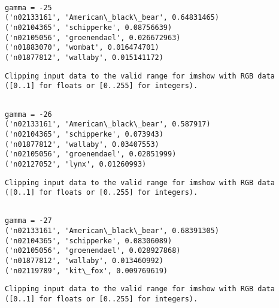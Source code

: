 \documentclass[11pt]{article}
\begin{document}
    \begin{Verbatim}[commandchars=\\\{\}]

gamma = -25
('n02133161', 'American\_black\_bear', 0.64831465)
('n02104365', 'schipperke', 0.08756639)
('n02105056', 'groenendael', 0.026672963)
('n01883070', 'wombat', 0.016474701)
('n01877812', 'wallaby', 0.015141172)

    \end{Verbatim}

    \begin{Verbatim}[commandchars=\\\{\}]
Clipping input data to the valid range for imshow with RGB data ([0..1] for floats or [0..255] for integers).

    \end{Verbatim}

    \begin{Verbatim}[commandchars=\\\{\}]

gamma = -26
('n02133161', 'American\_black\_bear', 0.587917)
('n02104365', 'schipperke', 0.073943)
('n01877812', 'wallaby', 0.03407553)
('n02105056', 'groenendael', 0.02851999)
('n02127052', 'lynx', 0.01260993)

    \end{Verbatim}

    \begin{Verbatim}[commandchars=\\\{\}]
Clipping input data to the valid range for imshow with RGB data ([0..1] for floats or [0..255] for integers).

    \end{Verbatim}

    \begin{Verbatim}[commandchars=\\\{\}]

gamma = -27
('n02133161', 'American\_black\_bear', 0.68391305)
('n02104365', 'schipperke', 0.08306089)
('n02105056', 'groenendael', 0.028927868)
('n01877812', 'wallaby', 0.013460992)
('n02119789', 'kit\_fox', 0.009769619)

    \end{Verbatim}

    \begin{Verbatim}[commandchars=\\\{\}]
Clipping input data to the valid range for imshow with RGB data ([0..1] for floats or [0..255] for integers).

    \end{Verbatim}
\end{document}
